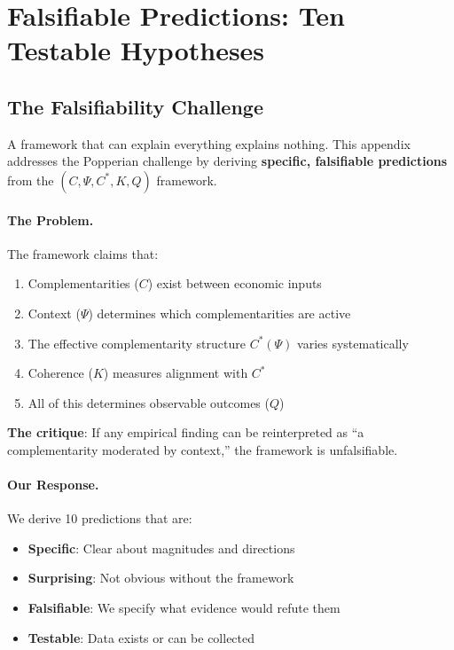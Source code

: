 \documentclass[12pt,a4paper]{article}
\begin{document}
\section{Falsifiable Predictions: Ten Testable Hypotheses}
\label{app:falsifiable}

\subsection{The Falsifiability Challenge}

A framework that can explain everything explains nothing. This appendix addresses the Popperian challenge by deriving \textbf{specific, falsifiable predictions} from the $(C, \Psi, C^*, K, Q)$ framework.

\paragraph{The Problem.}
The framework claims that:
\begin{enumerate}
    \item Complementarities ($C$) exist between economic inputs
    \item Context ($\Psi$) determines which complementarities are active
    \item The effective complementarity structure $C^*(\Psi)$ varies systematically
    \item Coherence ($K$) measures alignment with $C^*$
    \item All of this determines observable outcomes ($Q$)
\end{enumerate}

\textbf{The critique}: If any empirical finding can be reinterpreted as ``a complementarity moderated by context,'' the framework is unfalsifiable.

\paragraph{Our Response.}
We derive 10 predictions that are:
\begin{itemize}
    \item \textbf{Specific}: Clear about magnitudes and directions
    \item \textbf{Surprising}: Not obvious without the framework
    \item \textbf{Falsifiable}: We specify what evidence would refute them
    \item \textbf{Testable}: Data exists or can be collected
\end{itemize}
\end{document}
